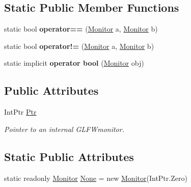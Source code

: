 \subsection*{Static Public Member Functions}
\begin{DoxyCompactItemize}
\item 
\mbox{\label{struct_glfw3_1_1_glfw_1_1_monitor_ab28f6749de933caf2197c05c1b4be400}} 
static bool {\bfseries operator==} (\mbox{\hyperlink{struct_glfw3_1_1_glfw_1_1_monitor}{Monitor}} a, \mbox{\hyperlink{struct_glfw3_1_1_glfw_1_1_monitor}{Monitor}} b)
\item 
\mbox{\label{struct_glfw3_1_1_glfw_1_1_monitor_a8eecee0d34c40ed82238d0962fc84cc8}} 
static bool {\bfseries operator!=} (\mbox{\hyperlink{struct_glfw3_1_1_glfw_1_1_monitor}{Monitor}} a, \mbox{\hyperlink{struct_glfw3_1_1_glfw_1_1_monitor}{Monitor}} b)
\item 
\mbox{\label{struct_glfw3_1_1_glfw_1_1_monitor_a0b6f0574725829d3a08ccb3c3739ac19}} 
static implicit {\bfseries operator bool} (\mbox{\hyperlink{struct_glfw3_1_1_glfw_1_1_monitor}{Monitor}} obj)
\end{DoxyCompactItemize}
\subsection*{Public Attributes}
\begin{DoxyCompactItemize}
\item 
Int\+Ptr \mbox{\hyperlink{struct_glfw3_1_1_glfw_1_1_monitor_acc46b2a1c920a789433af0d3c7f31150}{Ptr}}
\begin{DoxyCompactList}\small\item\em Pointer to an internal G\+L\+F\+Wmonitor. \end{DoxyCompactList}\end{DoxyCompactItemize}
\subsection*{Static Public Attributes}
\begin{DoxyCompactItemize}
\item 
static readonly \mbox{\hyperlink{struct_glfw3_1_1_glfw_1_1_monitor}{Monitor}} \mbox{\hyperlink{struct_glfw3_1_1_glfw_1_1_monitor_a5183550cc653d890a7d52d054cd7ba1d}{None}} = new \mbox{\hyperlink{struct_glfw3_1_1_glfw_1_1_monitor}{Monitor}}(Int\+Ptr.\+Zero)
\end{DoxyCompactItemize}


